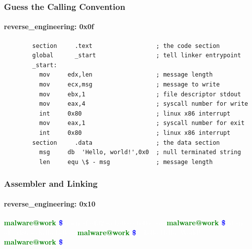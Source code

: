 \documentclass[aspectratio=169]{beamer}
\begin{document}
\begin{frame}[fragile]{}
  \frametitle{Guess the Calling Convention}
  \framesubtitle{reverse\_engineering: 0x0f}
  \begin{center}
    \begin{tcolorbox}[title=hello.asm,colback=black]
    \begin{minipage}{0.8\textwidth}
      \begin{verbatim}
        section     .text                  ; the code section
        global      _start                 ; tell linker entrypoint
        _start:
          mov     edx,len                  ; message length
          mov     ecx,msg                  ; message to write
          mov     ebx,1                    ; file descriptor stdout
          mov     eax,4                    ; syscall number for write
          int     0x80                     ; linux x86 interrupt
          mov     eax,1                    ; syscall number for exit
          int     0x80                     ; linux x86 interrupt
        section     .data                  ; the data section
          msg     db  'Hello, world!',0x0  ; null terminated string
          len     equ \$ - msg             ; message length
      \end{verbatim}
    \end{minipage}
    \end{tcolorbox}
  \end{center}
\end{frame}

\begin{frame}
  \frametitle{Assembler and Linking}
  \framesubtitle{reverse\_engineering: 0x10}
  \begin{center}
    \begin{tcolorbox}[title=terminal,colback=black]
      \begin{minipage}{0.8\textwidth}
        \textbf{\textcolor{green}{malware@work \textcolor{blue}{\~ \$}}} \textcolor{white}{ nasm -f elf32 -o hello.o hello.asm}
        \newline
        \textbf{\textcolor{green}{malware@work \textcolor{blue}{\~ \$}}} \textcolor{white}{ ld -m elf\_i386 -o hello hello.o}
        \newline
        \textbf{\textcolor{green}{malware@work \textcolor{blue}{\~ \$}}} \textcolor{white}{ ./hello}
        \newline
        \textcolor{white}{ Hello, World!}
        \newline
        \textbf{\textcolor{green}{malware@work \textcolor{blue}{\~ \$}}}
      \end{minipage}
    \end{tcolorbox}
  \end{center}
\end{frame}
\end{document}
